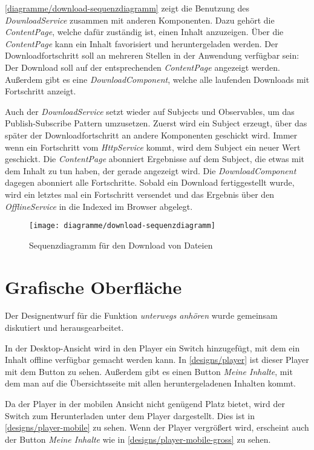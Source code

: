 \autoref{diagramme/download-sequenzdiagramm} zeigt die Benutzung des \textit{DownloadService} zusammen mit anderen Komponenten. Dazu gehört die \textit{ContentPage}, welche dafür zuständig ist, einen Inhalt anzuzeigen. Über die \textit{ContentPage} kann ein Inhalt favorisiert und heruntergeladen werden. Der Downloadfortschritt soll an mehreren Stellen in der Anwendung verfügbar sein: Der Download soll auf der entsprechenden \textit{ContentPage} angezeigt werden. Außerdem gibt es eine \textit{DownloadComponent}, welche alle laufenden Downloads mit Fortschritt anzeigt. 

Auch der \textit{DownloadService} setzt wieder auf Subjects und Observables, um das Publish-Subscribe Pattern umzusetzen. Zuerst wird ein Subject erzeugt, über das später der Downloadfortschritt an andere Komponenten geschickt wird. Immer wenn ein Fortschritt vom \textit{HttpService} kommt, wird dem Subject ein neuer Wert geschickt. Die \textit{ContentPage} abonniert Ergebnisse auf dem Subject, die etwas mit dem Inhalt zu tun haben, der gerade angezeigt wird. Die \textit{DownloadComponent} dagegen abonniert alle Fortschritte. Sobald ein Download fertiggestellt wurde, wird ein letztes mal ein Fortschritt versendet und das Ergebnis über den \textit{OfflineService} in die Indexed im Browser abgelegt.

\begin{sidewaysfigure}
 \texttt{[image: diagramme/download-sequenzdiagramm]}
  \caption{Sequenzdiagramm für den Download von Dateien}
  \label{diagramme/download-sequenzdiagramm}
\end{sidewaysfigure}

\section{Grafische Oberfläche}
Der Designentwurf für die Funktion \textit{unterwegs anhören} wurde gemeinsam diskutiert und herausgearbeitet. 

In der Desktop-Ansicht wird in den Player ein Switch hinzugefügt, mit dem ein Inhalt offline verfügbar gemacht werden kann. In \autoref{designs/player} ist dieser Player mit dem Button zu sehen. Außerdem gibt es einen Button \textit{Meine Inhalte}, mit dem man auf die Übersichtsseite mit allen heruntergeladenen Inhalten kommt.


Da der Player in der mobilen Ansicht nicht genügend Platz bietet, wird der Switch zum Herunterladen unter dem Player dargestellt. Dies ist in \autoref{designs/player-mobile} zu sehen. Wenn der Player vergrößert wird, erscheint auch der Button \textit{Meine Inhalte} wie in \autoref{designs/player-mobile-gross} zu sehen.

